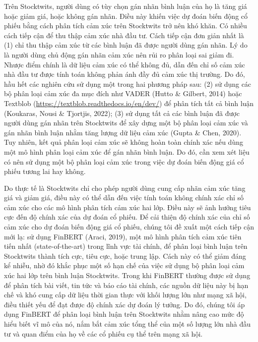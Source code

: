Trên Stocktwits, người dùng có tùy chọn gán nhãn bình luận của họ là tăng giá hoặc giảm giá, hoặc không gán nhãn. Điều này khiến việc dự đoán biến động cổ phiếu bằng cách phân tích cảm xúc trên Stocktwits trở nên khó khăn. Có nhiều cách tiếp cận để thu thập cảm xúc nhà đầu tư. Cách tiếp cận đơn giản nhất là (1) chỉ thu thập cảm xúc từ các bình luận đã được người dùng gán nhãn. Lý do là người dùng chủ động gán nhãn cảm xúc nên rủi ro phân loại sai giảm đi. Nhược điểm chính là dữ liệu cảm xúc có thể không đủ, dẫn đến chỉ số cảm xúc nhà đầu tư được tính toán không phản ánh đầy đủ cảm xúc thị trường. Do đó, hầu hết các nghiên cứu sử dụng một trong hai phương pháp sau: (2) sử dụng các bộ phân loại cảm xúc đa mục đích như VADER (Hutto \& Gilbert, 2014) hoặc Textblob (\url{https://textblob.readthedocs.io/en/dev/}) để phân tích tất cả bình luận (Koukaras, Nousi \& Tjortjis, 2022); (3) sử dụng tất cả các bình luận đã được người dùng gán nhãn trên Stocktwits để xây dựng một bộ phân loại cảm xúc và gán nhãn bình luận nhằm tăng lượng dữ liệu cảm xúc (Gupta \& Chen, 2020). Tuy nhiên, kết quả phân loại cảm xúc sẽ không hoàn toàn chính xác nếu dùng một mô hình phân loại cảm xúc để gán nhãn bình luận. Do đó, cần xem xét liệu có nên sử dụng một bộ phân loại cảm xúc trong việc dự đoán biến động giá cổ phiếu tương lai hay không.

Do thực tế là Stocktwits chỉ cho phép người dùng cung cấp nhãn cảm xúc tăng giá và giảm giá, điều này có thể dẫn đến việc tính toán không chính xác chỉ số cảm xúc cho các mô hình phân tích cảm xúc hai lớp. Điều này sẽ ảnh hưởng tiêu cực đến độ chính xác của dự đoán cổ phiếu. Để cải thiện độ chính xác của chỉ số cảm xúc cho dự đoán biến động giá cổ phiếu, chúng tôi đề xuất một cách tiếp cận mới lạ: sử dụng FinBERT (Araci, 2019), một mô hình phân tích cảm xúc tiên tiến nhất (state-of-the-art) trong lĩnh vực tài chính, để phân loại bình luận trên Stocktwits thành tích cực, tiêu cực, hoặc trung lập. Cách này có thể giảm đáng kể nhiễu, nhờ đó khắc phục một số hạn chế của việc sử dụng bộ phân loại cảm xúc hai lớp trên bình luận Stocktwits. Trong khi FinBERT thường được sử dụng để phân tích bài viết, tin tức và báo cáo tài chính, các nguồn dữ liệu này bị hạn chế và khó cung cấp dữ liệu thời gian thực với khối lượng lớn như mạng xã hội, điều thiết yếu để đạt được độ chính xác dự đoán lý tưởng. Do đó, chúng tôi áp dụng FinBERT để phân loại bình luận trên Stocktwits nhằm nâng cao mức độ hiểu biết vĩ mô của nó, nắm bắt cảm xúc tổng thể của một số lượng lớn nhà đầu tư và quan điểm của họ về các cổ phiếu cụ thể trên mạng xã hội.

